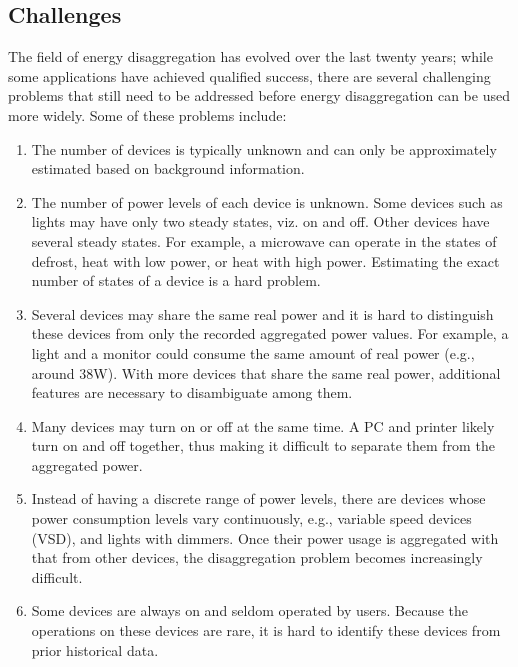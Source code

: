 \subsection {Challenges}
The field of energy disaggregation has evolved
over the last twenty years; while
some applications have achieved
qualified success, there are several challenging
problems that still need to be addressed before energy disaggregation can be
used more widely. Some of these problems include:

\begin{enumerate}
\item The number of devices is typically unknown and can only be
approximately estimated based on background information.

\item The number of power levels of each device is unknown.
Some devices such as lights may have only two steady states, viz. on and off.
Other devices  have several steady states.
For example, a microwave can operate in the states of defrost,
heat with low power, or heat with high power. Estimating
the exact number of states of a device is a hard problem.

\item Several devices may share the same real power and
it is hard to distinguish these devices from only the recorded aggregated
power values. 
For example, a light and a monitor could consume the same amount of real
power (e.g., around 38W). With more devices that share the same real power,
additional features are necessary to disambiguate among them.

\item Many devices may turn on or off at the same time.
A PC and printer likely turn on and off together, 
thus making it difficult to separate them from the aggregated power.

\item Instead of having a discrete range of power
levels, there are devices whose power consumption levels
   vary continuously, e.g.,
  variable speed devices (VSD), and lights with dimmers.
Once their power usage is aggregated with that from other devices, the
disaggregation problem becomes increasingly difficult.

\item Some devices are always on and seldom operated by
users. Because the operations on these devices are
rare, it is hard to identify these devices from prior historical data.

\end{enumerate}

